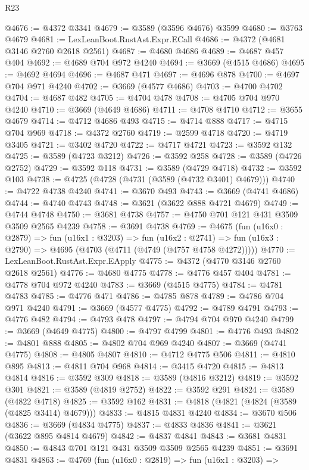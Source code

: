 \begin{lexlean}{R23}
\begin{coremodule}
@4676 := @4372 @3341
@4679 := @3589 (@3596 @4676) @3599
@4680 := @3763 @4679
@4681 := LexLeanBoot.RustAst.Expr.ECall
@4686 := @4372 (@4681 @3146 @2760 @2618 @2561)
@4687 := @4680 @4686
@4689 := @4687 @457 @404
@4692 := @4689 @704 @972 @4240
@4694 := @3669 (@4515 @4686)
@4695 := @4692 @4694
@4696 := @4687 @471
@4697 := @4696 @878
@4700 := @4697 @704 @971 @4240
@4702 := @3669 (@4577 @4686)
@4703 := @4700 @4702
@4704 := @4687 @482
@4705 := @4704 @478
@4708 := @4705 @704 @970 @4240
@4710 := @3669 (@4649 @4686)
@4711 := @4708 @4710
@4712 := @3655 @4679
@4714 := @4712 @4686 @493
@4715 := @4714 @888
@4717 := @4715 @704 @969
@4718 := @4372 @2760
@4719 := @2599 @4718
@4720 := @4719 @3405
@4721 := @3402 @4720
@4722 := @4717 @4721
@4723 := @3592 @132
@4725 := @3589 (@4723 @3212)
@4726 := @3592 @258
@4728 := @3589 (@4726 @2752)
@4729 := @3592 @118
@4731 := @3589 (@4729 @4718)
@4732 := @3592 @103
@4738 := @4725 (@4728 (@4731 (@3589 (@4732 @3401) @4679)))
@4740 := @4722 @4738 @4240
@4741 := @3670 @493
@4743 := @3669 (@4741 @4686)
@4744 := @4740 @4743
@4748 := @3621 (@3622 @888 @4721 @4679)
@4749 := @4744 @4748
@4750 := @3681 @4738
@4757 := @4750 @701 @121 @431 @3509 @3509 @2565 @4239
@4758 := @3691 @4738
@4769 := @4675
    (fun (u16x0 : @2879) =>
    fun (u16x1 : @3203) =>
    fun (u16x2 : @2741) => fun (u16x3 : @2790) => @4695 (@4703 (@4711 (@4749 (@4757 @4758 @4272)))))
@4770 := LexLeanBoot.RustAst.Expr.EApply
@4775 := @4372 (@4770 @3146 @2760 @2618 @2561)
@4776 := @4680 @4775
@4778 := @4776 @457 @404
@4781 := @4778 @704 @972 @4240
@4783 := @3669 (@4515 @4775)
@4784 := @4781 @4783
@4785 := @4776 @471
@4786 := @4785 @878
@4789 := @4786 @704 @971 @4240
@4791 := @3669 (@4577 @4775)
@4792 := @4789 @4791
@4793 := @4776 @482
@4794 := @4793 @478
@4797 := @4794 @704 @970 @4240
@4799 := @3669 (@4649 @4775)
@4800 := @4797 @4799
@4801 := @4776 @493
@4802 := @4801 @888
@4805 := @4802 @704 @969 @4240
@4807 := @3669 (@4741 @4775)
@4808 := @4805 @4807
@4810 := @4712 @4775 @506
@4811 := @4810 @895
@4813 := @4811 @704 @968
@4814 := @3415 @4720
@4815 := @4813 @4814
@4816 := @3592 @309
@4818 := @3589 (@4816 @3212)
@4819 := @3592 @301
@4821 := @3589 (@4819 @2752)
@4822 := @3592 @291
@4824 := @3589 (@4822 @4718)
@4825 := @3592 @162
@4831 := @4818 (@4821 (@4824 (@3589 (@4825 @3414) @4679)))
@4833 := @4815 @4831 @4240
@4834 := @3670 @506
@4836 := @3669 (@4834 @4775)
@4837 := @4833 @4836
@4841 := @3621 (@3622 @895 @4814 @4679)
@4842 := @4837 @4841
@4843 := @3681 @4831
@4850 := @4843 @701 @121 @431 @3509 @3509 @2565 @4239
@4851 := @3691 @4831
@4863 := @4769
    (fun (u16x0 : @2819) =>
    fun (u16x1 : @3203) =>

\end{coremodule}
\end{lexlean}
